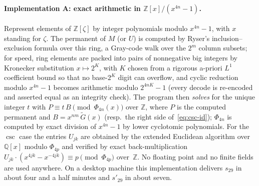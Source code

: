 \documentclass[10pt]{article}
\theoremstyle{remark}
\newcommand{\Z}{\mathbb{Z}}
\newcommand{\Q}{\mathbb{Q}}
\begin{document}
\paragraph{Implementation A: exact arithmetic in $\Z[x]/(x^{4n}-1)$.}
Represent elements of $\Z[\zeta]$ by integer polynomials modulo
$x^{4n}-1$, with $x$ standing for $\zeta$. The permanent of $M$ (or $U$) is
computed by Ryser's inclusion--exclusion formula \cite{Ryser1963} over this
ring, a Gray-code walk over the $2^m$ column subsets; for speed, ring
elements are packed into pairs of nonnegative big integers by Kronecker
substitution $x\mapsto 2^{K}$, with $K$ chosen from a rigorous a-priori
$L^1$ coefficient bound so that no base-$2^{K}$ digit can overflow, and
cyclic reduction modulo $x^{4n}-1$ becomes arithmetic modulo $2^{4nK}-1$
(every decode is re-encoded and asserted equal as an integrity check). The
program then \emph{solves} for the unique integer $t$ with $P\equiv
t\,B\pmod{\Phi_{4n}(x)}$ over $\Z$, where $P$ is the computed permanent and
$B=x^{nm}\,\widetilde G(x)$ (resp.\ the right side of~\eqref{eq:csc-id});
$\Phi_{4n}$
is computed by exact division of $x^{4n}-1$ by lower cyclotomic
polynomials. For the $\csc$ case the entries $U_{jk}$ are obtained by the
extended Euclidean algorithm over $\Q[x]$ modulo $\Phi_{4p}$ and verified
by exact back-multiplication $U_{jk}\cdot(x^{4jk}-x^{-4jk})\equiv
p\pmod{\Phi_{4p}}$ over~$\Z$. No floating point and no finite fields are
used anywhere. On a desktop machine this implementation delivers $s_{29}$
in about four and a half minutes and $s'_{29}$ in about seven.
\end{document}

